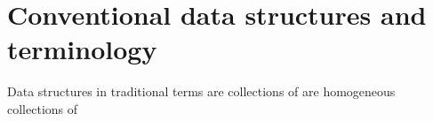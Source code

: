 \chapter{Conventional data structures and terminology}
Data structures in traditional terms are collections of are homogeneous collections of 

